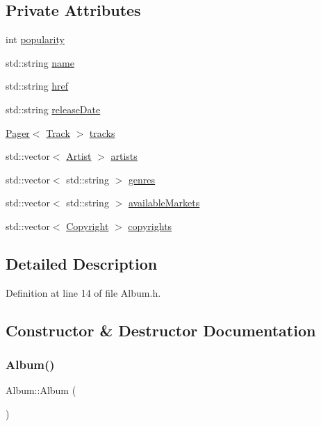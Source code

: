 \subsection*{Private Attributes}
\begin{DoxyCompactItemize}
\item 
int \mbox{\hyperlink{class_album_a03460cab9bc5879e89f1c7969d6bf442}{popularity}}
\item 
std\+::string \mbox{\hyperlink{class_album_a3467537690b1465e740fdfd12d076ac9}{name}}
\item 
std\+::string \mbox{\hyperlink{class_album_a0bb0761ec3abcfe5e429e1cdec7569e4}{href}}
\item 
std\+::string \mbox{\hyperlink{class_album_a0623e76931455275275a9fc1dd2e7e1f}{release\+Date}}
\item 
\mbox{\hyperlink{class_pager}{Pager}}$<$ \mbox{\hyperlink{class_track}{Track}} $>$ \mbox{\hyperlink{class_album_ac60f912bb1c8e57c02feb77c3cc6d239}{tracks}}
\item 
std\+::vector$<$ \mbox{\hyperlink{class_artist}{Artist}} $>$ \mbox{\hyperlink{class_album_a78849dfc871f2af6eae2800783b867d3}{artists}}
\item 
std\+::vector$<$ std\+::string $>$ \mbox{\hyperlink{class_album_ac98ad6106f66e02f6aef208f4f102453}{genres}}
\item 
std\+::vector$<$ std\+::string $>$ \mbox{\hyperlink{class_album_aa5ad286911b8955fc5c8ea4e98a42b0d}{available\+Markets}}
\item 
std\+::vector$<$ \mbox{\hyperlink{class_copyright}{Copyright}} $>$ \mbox{\hyperlink{class_album_ace8d3c2e8ab7226fb7bdb5c15391b56a}{copyrights}}
\end{DoxyCompactItemize}


\subsection{Detailed Description}


Definition at line 14 of file Album.\+h.



\subsection{Constructor \& Destructor Documentation}
\mbox{\label{class_album_a5442b9cbed3b590e2e1151a9f262dd7a}} 
\subsubsection{\texorpdfstring{Album()}{Album()}\hspace{0.1cm}{\footnotesize\ttfamily [1/2]}}
{\footnotesize\ttfamily Album\+::\+Album (\begin{DoxyParamCaption}{ }\end{DoxyParamCaption})\hspace{0.3cm}{\ttfamily [default]}}

